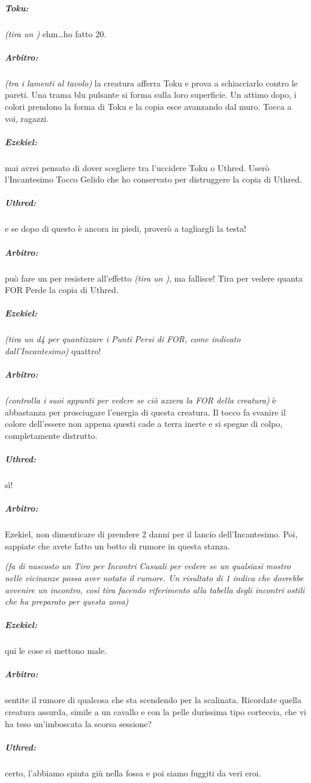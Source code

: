 \documentclass[itdr]{subfiles}
\begin{document}
{\subparagraph{Toku:} {\em (tira un )} ehm\ldots ho fatto 20.

\subparagraph{Arbitro:} {\em (tra i lamenti al tavolo)} la creatura afferra Toku e prova a schiacciarlo contro le pareti. Una trama blu pulsante si forma sulla loro superficie. Un attimo dopo, i colori prendono la forma di Toku e la copia esce avanzando dal muro. Tocca a voi, ragazzi.

\subparagraph{Ezekiel:} mai avrei pensato di dover scegliere tra l'uccidere Toku o Uthred. Userò l'Incantesimo Tocco Gelido che ho conservato per distruggere la copia di Uthred.

\subparagraph{Uthred:} e se dopo di questo è ancora in piedi, proverò a tagliargli la testa!

\break

\subparagraph{Arbitro:} può fare un  per resistere all'effetto {\em (tira un )}, ma fallisce! Tira per vedere quanta FOR Perde la copia di Uthred.

\subparagraph{Ezekiel:} {\em (tira un d4 per quantizzare i Punti Persi di FOR, come indicato dall'Incantesimo)} quattro!

\subparagraph{Arbitro:} {\em (controlla i suoi appunti per vedere se ciò azzera la FOR della creatura)} è abbastanza per prosciugare l'energia di questa creatura. Il tocco fa svanire il colore dell'essere non appena questi cade a terra inerte e si spegne di colpo, completamente distrutto.

\subparagraph{Uthred:} sì!

\subparagraph{Arbitro:} Ezekiel, non dimenticare di prendere 2 danni per il lancio dell'Incantesimo. Poi, sappiate che avete fatto un botto di rumore in questa stanza.

{\em (fa di nascosto un Tiro per Incontri Casuali per vedere se un qualsiasi mostro nelle vicinanze possa aver notato il rumore. Un risultato di 1 indica che dovrebbe avvenire un incontro, così tira facendo riferimento alla tabella degli incontri ostili che ha preparato per questa zona)}

\subparagraph{Ezekiel:} qui le cose si mettono male.

\subparagraph{Arbitro:} sentite il rumore di qualcosa che sta scendendo per la scalinata. Ricordate quella creatura assurda, simile a un cavallo e con la pelle durissima tipo corteccia, che vi ha teso un'imboscata la scorsa sessione?

\subparagraph{Uthred:} certo, l'abbiamo spinta giù nella fossa e poi siamo fuggiti da veri eroi.

}
\end{document}
